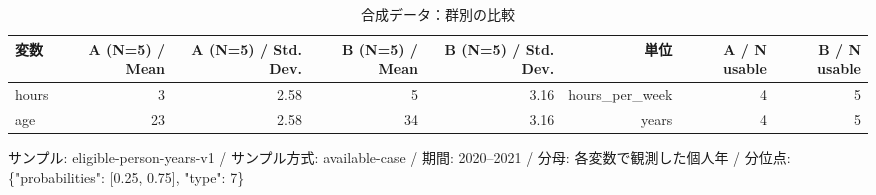 \begin{table}[htbp]
\centering
\begin{tabular}{lrrrrrrr}
\hline
変数 & A (N=5) / Mean & A (N=5) / Std. Dev. & B (N=5) / Mean & B (N=5) / Std. Dev. & 単位 & A / N usable & B / N usable \\
\hline
hours & 3 & 2.58 & 5 & 3.16 & hours\_per\_week & 4 & 5 \\
age & 23 & 2.58 & 34 & 3.16 & years & 4 & 5 \\
\hline
\end{tabular}
\caption{合成データ：群別の比較}
\par\small サンプル: eligible-person-years-v1 / サンプル方式: available-case / 期間: 2020–2021 / 分母: 各変数で観測した個人年 / 分位点: \{"probabilities": [0.25, 0.75], "type": 7\}
\end{table}
